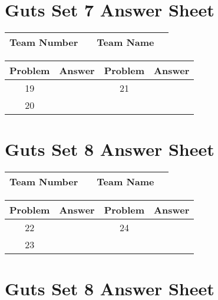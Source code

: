 \documentclass[14pt]{article}
\begin{document}
\vspace{30px}

\section*{Guts Set 7 Answer Sheet}

\begin{center}
\begin{tabular}{|r|r|r|r|}
\hline
	Team Number & \hspace{10em} &
	Team Name & \hspace{15em} \\ \hline
\end{tabular}
\end{center}
\begin{tabularx}{\textwidth}{|c|l|c|X|}\hline
	Problem & Answer & Problem & Answer \\\hline
	19 & \hspace{15em} & 21 & \\\hline
	20 & & & \\\hline
\end{tabularx}

\section*{Guts Set 8 Answer Sheet}

\begin{center}
\begin{tabular}{|r|r|r|r|}
\hline
	Team Number & \hspace{10em} &
	Team Name & \hspace{15em} \\ \hline
\end{tabular}
\end{center}
\begin{tabularx}{\textwidth}{|c|l|c|X|}\hline
	Problem & Answer & Problem & Answer \\\hline
	22 & \hspace{15em} & 24 & \\\hline
	23 & & & \\\hline
\end{tabularx}

\vspace{30px}

\section*{Guts Set 8 Answer Sheet}
\end{document}
